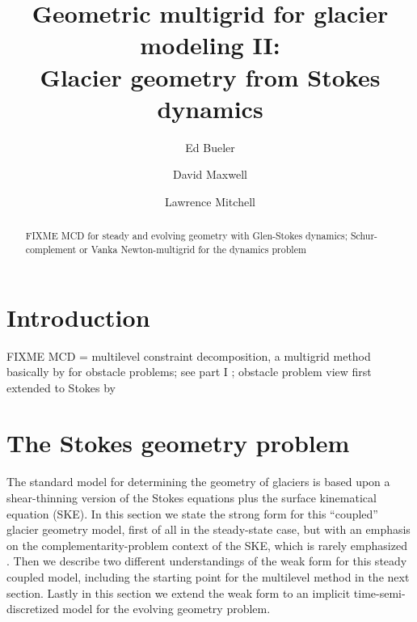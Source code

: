 \documentclass[letterpaper,final,12pt,reqno]{amsart}
\theoremstyle{claim}
\numberwithin{equation}{section}
\numberwithin{figure}{section}
\numberwithin{table}{section}
\numberwithin{theorem}{section}
\begin{document}
\title[Geometric multigrid for glacier modeling II]{Geometric multigrid for glacier modeling II: \\ Glacier geometry from Stokes dynamics}

\author{Ed Bueler}

\author{David Maxwell}

\author{Lawrence Mitchell}

\begin{abstract} FIXME MCD for steady and evolving geometry with Glen-Stokes dynamics; Schur-complement or Vanka Newton-multigrid for the dynamics problem
\end{abstract}

\maketitle

\tableofcontents

\thispagestyle{empty}

\section{Introduction} \label{sec:intro}

FIXME MCD = multilevel constraint decomposition, a multigrid \cite{Trottenbergetal2001} method basically by \cite{Tai2003} for obstacle problems; see part I \cite{Bueler2022partI};  obstacle problem view first extended to Stokes by \cite{WirbelJarosch2020}


\section{The Stokes geometry problem} \label{sec:stokesgeometry}

The standard model for determining the geometry of glaciers is based upon a shear-thinning version of the Stokes equations plus the surface kinematical equation (SKE).  In this section we state the strong form for this ``coupled'' glacier geometry model, first of all in the steady-state case, but with an emphasis on the complementarity-problem context of the SKE, which is rarely emphasized \cite{SchoofHewitt2013}.  Then we describe two different understandings of the weak form for this steady coupled model, including the starting point for the multilevel method in the next section.  Lastly in this section we extend the weak form to an implicit time-semi-discretized model for the evolving geometry problem.
\end{document}
